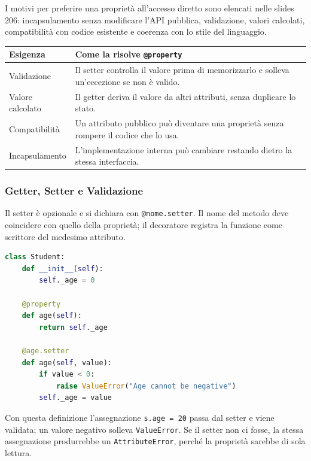 \documentclass[12pt]{extarticle}
\begin{document}
\noindent I motivi per preferire una proprietà all'accesso diretto sono elencati nelle slides 206: incapsulamento senza modificare l'API pubblica, validazione, valori calcolati, compatibilità con codice esistente e coerenza con lo stile del linguaggio.

\begin{center}
\small
\begin{tabular}{p{4.0cm}p{9.6cm}}
    \toprule
    \textbf{Esigenza} & \textbf{Come la risolve \texttt{@property}} \\
    \midrule
    Validazione & Il setter controlla il valore prima di memorizzarlo e solleva un'eccezione se non è valido. \\
    \addlinespace
    Valore calcolato & Il getter deriva il valore da altri attributi, senza duplicare lo stato. \\
    \addlinespace
    Compatibilità & Un attributo pubblico può diventare una proprietà senza rompere il codice che lo usa. \\
    \addlinespace
    Incapsulamento & L'implementazione interna può cambiare restando dietro la stessa interfaccia. \\
    \bottomrule
\end{tabular}
\end{center}

\subsubsection{Getter, Setter e Validazione}

\noindent Il setter è opzionale e si dichiara con \texttt{@nome.setter}. Il nome del metodo deve coincidere con quello della proprietà; il decoratore registra la funzione come scrittore del medesimo attributo.

\begin{lstlisting}[language=Python]
class Student:
    def __init__(self):
        self._age = 0

    @property
    def age(self):
        return self._age

    @age.setter
    def age(self, value):
        if value < 0:
            raise ValueError("Age cannot be negative")
        self._age = value
\end{lstlisting}

\noindent Con questa definizione l'assegnazione \texttt{s.age = 20} passa dal setter e viene validata; un valore negativo solleva \texttt{ValueError}. Se il setter non ci fosse, la stessa assegnazione produrrebbe un \texttt{AttributeError}, perché la proprietà sarebbe di sola lettura.
\end{document}
